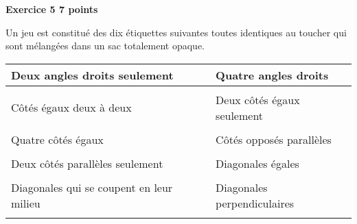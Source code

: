 \textbf{Exercice 5 \hfill 7 points}

\medskip

Un jeu est constitué des dix étiquettes suivantes toutes identiques au toucher qui sont mélangées dans un sac totalement opaque.

\bigskip

{\footnotesize \begin{tabularx}{\linewidth} {|>{\centering \arraybackslash}X|m{0.5cm}|>{\centering \arraybackslash}X|}\cline{1-1}\cline{3-3}
Deux angles droits seulement &&Quatre angles droits\\\cline{1-1}\cline{3-3}
\multicolumn{3}{c}{~}\\\cline{1-1}\cline{3-3}
Côtés égaux deux à deux &&Deux côtés égaux seulement \\\cline{1-1}\cline{3-3}
\multicolumn{3}{c}{~}\\\cline{1-1}\cline{3-3}
Quatre côtés égaux &&Côtés opposés parallèles\\\cline{1-1}\cline{3-3} 
\multicolumn{3}{c}{~}\\\cline{1-1}\cline{3-3}
Deux côtés parallèles seulement &&Diagonales égales\\\cline{1-1}\cline{3-3} 
\multicolumn{3}{c}{~}\\\cline{1-1}\cline{3-3}
Diagonales qui se coupent en leur milieu &&Diagonales perpendiculaires\\\cline{1-1}\cline{3-3}
\end{tabularx}} 

\bigskip

